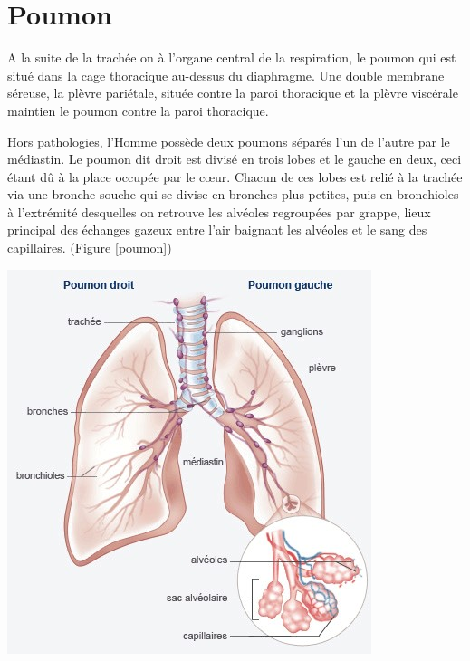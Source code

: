
\chapter{Poumon} %


\label{ch:01-02} %



A la suite de la trachée on à l’organe central de la respiration, le poumon qui est situé dans la cage thoracique au-dessus du diaphragme. Une double membrane séreuse, la plèvre pariétale, située contre la paroi thoracique et la plèvre viscérale maintien le poumon contre la paroi thoracique. 

Hors pathologies, l’Homme possède deux poumons séparés l’un de l’autre par le médiastin. Le poumon dit droit est divisé en trois lobes et le gauche en deux, ceci étant dû à la place occupée par le cœur. Chacun de ces lobes est relié à la trachée via une bronche souche qui se divise en bronches plus petites, puis en bronchioles à l’extrémité desquelles on retrouve les alvéoles regroupées par grappe, lieux principal des échanges gazeux entre l'air baignant les alvéoles et le sang des capillaires. (Figure \ref{poumon})

\begin{center}
\includegraphics[scale=0.7]{gfx/poumon.jpg} 
\captionsetup{type=figure}
       \label{poumon}
\end{center}

